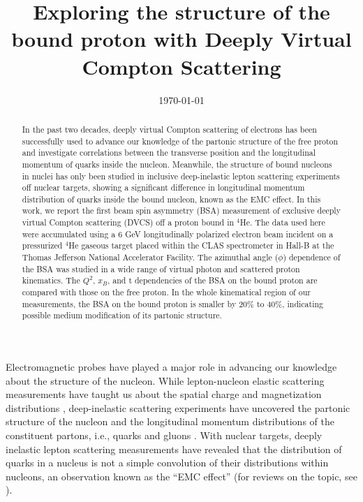 \documentclass[twocolumn,nofootinbib,prl,superscriptaddress,secnumarabic,amssymb,nobibnotes,aps,floatfix]{revtex4}
\begin{document}

\title{Exploring the structure of the bound proton with Deeply Virtual Compton Scattering}



\date{\today}
\begin{abstract}
In the past two decades, deeply virtual Compton scattering of electrons has 
   been successfully used to advance our knowledge of the partonic structure of 
   the free proton and investigate correlations between the transverse position 
   and the longitudinal momentum of quarks inside the nucleon. Meanwhile, the 
   structure of bound nucleons in nuclei has only been studied in inclusive 
   deep-inelastic lepton scattering experiments off nuclear targets, showing a 
   significant difference in longitudinal momentum distribution of quarks 
   inside the bound nucleon, known as
the EMC effect. In this work, we report the first beam spin asymmetry (BSA) 
   measurement of exclusive deeply virtual Compton scattering (DVCS) off a 
   proton bound in $^4$He.  The data used here were accumulated using a $6$ GeV 
   longitudinally polarized electron beam incident on
a pressurized $^4$He gaseous target placed within the CLAS spectrometer in Hall-B at the Thomas
Jefferson National Accelerator Facility. The azimuthal angle ($\phi$) dependence of the BSA was
studied in a wide range of virtual photon and scattered proton kinematics. The 
   $Q^2$, $x_B$,
and t dependencies of the BSA on the bound proton are compared with those on the free proton.
In the whole kinematical region of our measurements, the BSA on the bound proton is smaller by
20\% to 40\%, indicating possible medium modification of its partonic structure.
\end{abstract}

\maketitle 

Electromagnetic probes have played a major role in advancing our knowledge 
about the structure of the nucleon. While lepton-nucleon elastic scattering 
measurements have 
taught us about the spatial charge and magnetization distributions 
\cite{Hofstadter:1955ae,Perdrisat:2006hj}, deep-inelastic scattering 
experiments have uncovered the partonic structure of the nucleon and 
the longitudinal momentum distributions of the constituent partons, i.e., 
quarks and gluons \cite{pdg}.  With nuclear targets, deeply inelastic lepton 
scattering measurements have revealed that the distribution of quarks in a 
nucleus is not a simple convolution of their distributions within nucleons, an 
observation known as the ``EMC effect''\cite{EMC_first} (for reviews on the 
topic, see  \cite{Arneodo:1992wf,Geesaman:1995yd,Norton:2003cb,Hen:2016kwk}).
\end{document}
